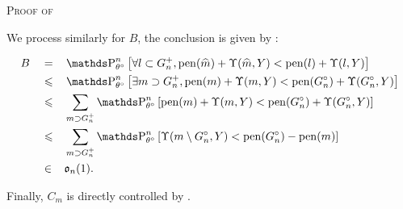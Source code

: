 \begin{pro}{\textsc{Proof of } \\}
\medskip

We process similarly for $B$, the conclusion is given by :

\begin{alignat*}{4}
& B && = && \P_{\theta^{\circ}}^{n}\left[ \forall l \subset G^{+}_{n}, \pen(\widehat{m}) + \Upsilon(\widehat{m}, Y) < \pen(l) + \Upsilon(l, Y) \right]\\
& && \leq && \P_{\theta^{\circ}}^{n}\left[ \exists m \supset G^{+}_{n}, \pen(m) + \Upsilon(m, Y) < \pen(G^{\circ}_{n}) + \Upsilon(G^{\circ}_{n}, Y) \right]\\
& && \leq && \sum\limits_{m \supset G^{+}_{n}}\P_{\theta^{\circ}}^{n}\left[\pen(m) + \Upsilon(m, Y) < \pen(G^{\circ}_{n}) + \Upsilon(G^{\circ}_{n}, Y) \right]\\
& && \leq && \sum\limits_{m \supset G^{+}_{n}}\P_{\theta^{\circ}}^{n}\left[\Upsilon(m \setminus G^{\circ}_{n}, Y) < \pen(G^{\circ}_{n}) - \pen(m)\right]\\
& && \in && \mathfrak{o}_{n}(1).
\end{alignat*}

\medskip

Finally, $C_{m}$ is directly controlled by .

\qedsymbol
\end{pro}